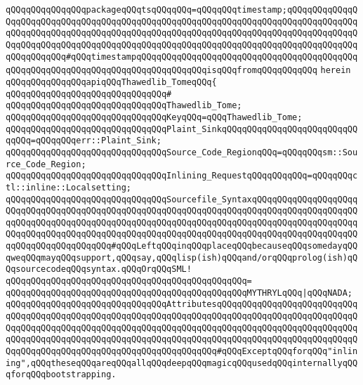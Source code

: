 \verb|qQQqqQQqqQQqqQQqpackageqQQqtsqQQqqQQq=qQQqqQQqtimestamp;qQQqqQQqqQQqqQQqqQQqqQQqqQQqqQQqqQQqqQQqqQQqqQQqqQQqqQQqqQQqqQQqqQQqqQQqqQQqqQQqqQQqqQQqqQQqqQQqqQQqqQQqqQQqqQQqqQQqqQQqqQQqqQQqqQQqqQQqqQQqqQQqqQQqqQQqqQQqqQQqqQQqqQQqqQQqqQQqqQQqqQQqqQQqqQQqqQQqqQQqqQQqqQQqqQQqqQQqqQQqqQQqqQQqqQQqqQQq#qQQqtimestampqQQqqQQqqQQqqQQqqQQqqQQqqQQqqQQqqQQqqQQqqQQqqQQqqQQqqQQqqQQqqQQqqQQqqQQqqQQqqQQqqQQqisqQQqfromqQQqqQQqqQQq|\newline
\verb|herein|\newline
\newline
\verb|qQQqqQQqqQQqqQQqapiqQQqThawedlib_TomeqQQq{|\newline
\verb|qQQqqQQqqQQqqQQqqQQqqQQqqQQqqQQq#|\newline
\verb|qQQqqQQqqQQqqQQqqQQqqQQqqQQqqQQqThawedlib_Tome;|\newline
\newline
\verb|qQQqqQQqqQQqqQQqqQQqqQQqqQQqqQQqKeyqQQq=qQQqThawedlib_Tome;|\newline
\newline
\verb|qQQqqQQqqQQqqQQqqQQqqQQqqQQqqQQqPlaint_SinkqQQqqQQqqQQqqQQqqQQqqQQqqQQqqQQq=qQQqqQQqerr::Plaint_Sink;|\newline
\newline
\verb|qQQqqQQqqQQqqQQqqQQqqQQqqQQqqQQqSource_Code_RegionqQQq=qQQqqQQqsm::Source_Code_Region;|\newline
\verb|qQQqqQQqqQQqqQQqqQQqqQQqqQQqqQQqInlining_RequestqQQqqQQqqQQq=qQQqqQQqctl::inline::Localsetting;|\newline
\newline
\verb|qQQqqQQqqQQqqQQqqQQqqQQqqQQqqQQqSourcefile_SyntaxqQQqqQQqqQQqqQQqqQQqqQQqqQQqqQQqqQQqqQQqqQQqqQQqqQQqqQQqqQQqqQQqqQQqqQQqqQQqqQQqqQQqqQQqqQQqqQQqqQQqqQQqqQQqqQQqqQQqqQQqqQQqqQQqqQQqqQQqqQQqqQQqqQQqqQQqqQQqqQQqqQQqqQQqqQQqqQQqqQQqqQQqqQQqqQQqqQQqqQQqqQQqqQQqqQQqqQQqqQQqqQQqqQQqqQQqqQQqqQQqqQQqqQQqqQQq#qQQqLeftqQQqinqQQqplaceqQQqbecauseqQQqsomedayqQQqweqQQqmayqQQqsupport,qQQqsay,qQQqlisp(ish)qQQqand/orqQQqprolog(ish)qQQqsourcecodeqQQqsyntax.qQQqOrqQQqSML!|\newline
\verb|qQQqqQQqqQQqqQQqqQQqqQQqqQQqqQQqqQQqqQQqqQQqqQQq=|\newline
\verb|qQQqqQQqqQQqqQQqqQQqqQQqqQQqqQQqqQQqqQQqqQQqqQQqMYTHRYLqQQq|\verb#|qQQqNADA;#\newline
\newline
\verb|qQQqqQQqqQQqqQQqqQQqqQQqqQQqqQQqAttributesqQQqqQQqqQQqqQQqqQQqqQQqqQQqqQQqqQQqqQQqqQQqqQQqqQQqqQQqqQQqqQQqqQQqqQQqqQQqqQQqqQQqqQQqqQQqqQQqqQQqqQQqqQQqqQQqqQQqqQQqqQQqqQQqqQQqqQQqqQQqqQQqqQQqqQQqqQQqqQQqqQQqqQQqqQQqqQQqqQQqqQQqqQQqqQQqqQQqqQQqqQQqqQQqqQQqqQQqqQQqqQQqqQQqqQQqqQQqqQQqqQQqqQQqqQQqqQQqqQQqqQQqqQQqqQQqqQQqqQQq#qQQqExceptqQQqforqQQq"inlining",qQQqtheseqQQqareqQQqallqQQqdeepqQQqmagicqQQqusedqQQqinternallyqQQqforqQQqbootstrapping.|\newline
